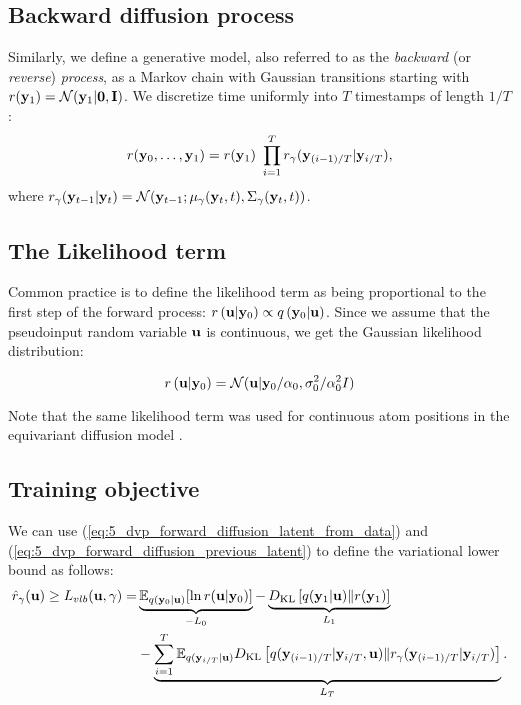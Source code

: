 \subsection*{Backward diffusion process}
Similarly, we define a generative model, also referred to as the \textit{backward} (or \textit{reverse}) \textit{process}, as a Markov chain with Gaussian transitions starting with $r({\mathbf{y}}_1) = \mathcal{N}({\mathbf{y}}_{1}| \boldsymbol{0}, \mathbf{I})$. We discretize time uniformly into $T$ timestamps of length $1/T$:
\begin{equation} \label{eq:5_dvp_backward_diffusion}
    r(\rvy_0, \ldots, \rvy_{1}) = r(\rvy_1)\ \prod_{i=1}^{T} r_{\gamma}(\rvy_{(i-1)/T} | \rvy_{i/T}),
\end{equation}
where $r_{\gamma}({\mathbf{y}}_{t-1} | {\mathbf{y}}_{t}) = \mathcal{N}({\mathbf{y}}_{t-1}; \mu_{\gamma}({\mathbf{y}}_{t}, t), \Sigma_{\gamma}({\mathbf{y}}_{t}, t))$.

\subsection*{The Likelihood term}

Common practice is to define the likelihood term as being proportional to the first step of the forward process: $r\left({\mathbf{u}}| {\mathbf{y}}_{0} \right) \propto q\left( {\mathbf{y}}_{0} |{\mathbf{u}}\right)$. Since we assume that the pseudoinput random variable ${\mathbf{u}}$ is continuous, we get the Gaussian likelihood distribution:

\begin{equation}
    r\left({\mathbf{u}}| {\mathbf{y}}_{0} \right) = \mathcal{N}({\mathbf{u}} | {\mathbf{y}}_0 / \alpha_0, \sigma_0^2 / \alpha_0^2 I)
\end{equation}

Note that the same likelihood term was used for continuous atom positions in the equivariant diffusion model \citep{hoogeboom2022equivariant}.


\subsection*{Training objective}

We can use (\ref{eq:5_dvp_forward_diffusion_latent_from_data}) and (\ref{eq:5_dvp_forward_diffusion_previous_latent}) to define the variational lower bound as follows:
\begin{align} \label{eq:diff_elbo_appx}
    \hat{r}_{\gamma}(\rvu) \geq L_{vlb}(\rvu, \gamma) = & \underbrace{\E_{q(\rvy_0|\rvu)}[\ln r(\rvu|\rvy_0)]}_{-L_0} %
    - \underbrace{\KL{q(\rvy_1 |\rvu)}{r(\rvy_1)}}_{L_1}  \\
    & - \underbrace{\sum_{i=1}^T \E_{q(\rvy_{i/T}|\rvu)} \KL{q(\rvy_{(i-1)/T}|\rvy_{i/T}, \rvu)}{r_{\gamma}(\rvy_{(i-1)/T}|\rvy_{i/T})}}_{L_{T}}. \notag
\end{align}

